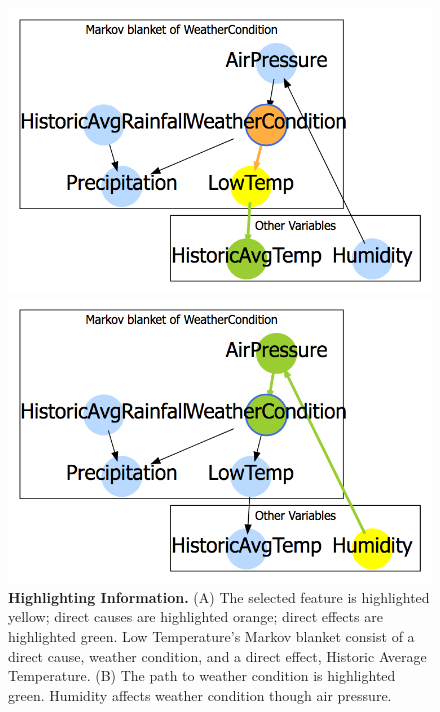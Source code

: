 \begin{figure}[!htbp]
    \centering
    \begin{minipage}{0.5\textwidth}
        \centering
        \includegraphics[width=1\textwidth]{CausalGraph1}
    \end{minipage}\hfill
    \begin{minipage}{0.5\textwidth}
        \centering
        \includegraphics[width=1\textwidth]{CausalGraph2}
    \end{minipage}
    \caption{\textbf{Highlighting Information.} (A) The selected feature is highlighted yellow; direct causes are highlighted orange; direct effects are highlighted green. Low Temperature's Markov blanket consist of a direct cause, weather condition, and a direct effect, Historic Average Temperature. (B) The path to weather condition is highlighted green. Humidity affects weather condition though air pressure.}
    \label{fig:CausalGraphs}
\end{figure}

